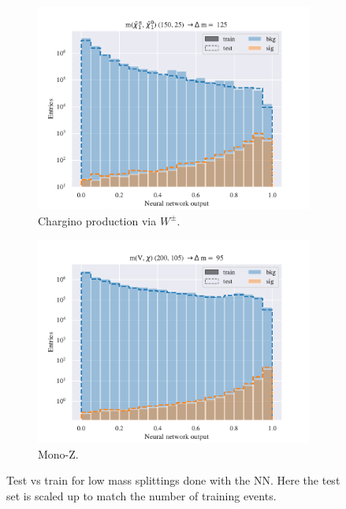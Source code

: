 \begin{figure}[H]
    \begin{subfigure}[t!]{0.49\textwidth}
        \includegraphics[width = \textwidth]{Figures/WW/NN/All_level/Low/scaled_train_test_395268.pdf}
        \caption{Chargino production via $W^\pm$.}
        \label{fig:WWNNLow}
    \end{subfigure}
    \begin{subfigure}[t!]{0.49\textwidth}
        \includegraphics[width = \textwidth]{Figures/Mono_Z/ML/NN/All_level/Low/scaled_train_test_310604.pdf}
        \caption{Mono-Z.}
        \label{fig:MonoZNNLow}
    \end{subfigure}
    \caption{Test vs train for low mass splittings done with the NN. Here the test set is scaled up to match the number of training events.}
    \label{fig:AllLowNN}
\end{figure}

